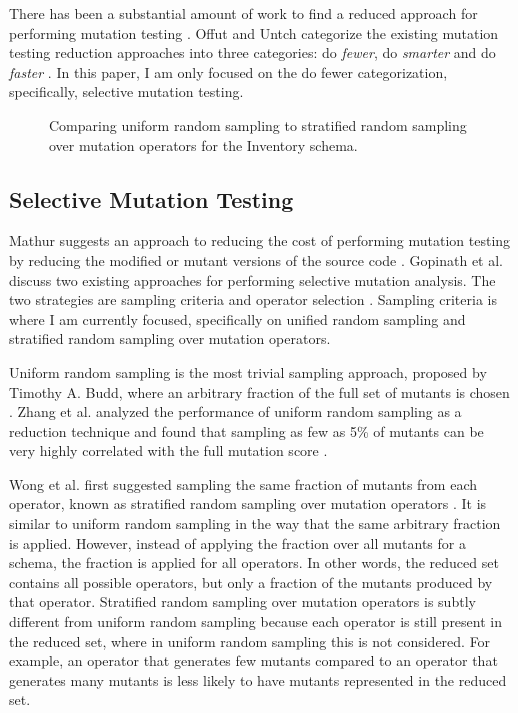 \documentclass[conference]{IEEEtran}
\begin{document}
There has been a substantial amount of work to find a reduced approach
for performing mutation testing \cite{gopinath2015empirical, mcminnvirtual, gopinath2015mutation, offutt1993experimental}.
Offut and Untch categorize the existing mutation testing reduction approaches
into three categories: do \textit{fewer}, do \textit{smarter} and do \textit{faster} \cite{offutt1993experimental}.
In this paper, I am only focused on the do fewer categorization,
specifically, selective mutation testing.

\begin{figure*}[!ht]
\centering
{}
\hfil
{}
\caption{Comparing uniform random sampling to stratified random sampling over
mutation operators for the Inventory schema.}
\label{fig:comp}
\end{figure*}


\subsection{Selective Mutation Testing}
Mathur suggests an approach to reducing the cost of performing mutation testing by
reducing the modified or mutant versions of the source code \cite{mathur1991performance}.
Gopinath et al. discuss two existing approaches for performing selective
mutation analysis. The two strategies are
sampling criteria and operator selection \cite{gopinath2015mutation}. Sampling criteria is where I am
currently focused, specifically on unified random sampling and stratified
random sampling over mutation operators.

Uniform random sampling is the most trivial sampling approach, proposed by Timothy A. Budd,
where an arbitrary fraction of the full set of mutants is chosen \cite{budd1980mutation}.
Zhang et al. analyzed the performance of uniform random sampling as a reduction technique
and found that sampling as few as 5\% of mutants can be very highly correlated with the full mutation
score \cite{zhang2010operator, zhang2013operator}.

Wong et al. first suggested sampling the same fraction of mutants from each operator, known as
stratified random sampling over mutation operators \cite{wong1995reducing}. It is similar
to uniform random sampling in the way that the same arbitrary fraction is applied. However,
instead of applying the fraction over all mutants for a schema, the fraction is applied for all operators. In other
words, the reduced set contains all possible operators, but only a fraction of the mutants
produced by that operator. Stratified random sampling over mutation operators is subtly different
from uniform random sampling because each operator is still present in the reduced set, where
in uniform random sampling this is not considered. For example, an operator that generates few
mutants compared to an operator that generates many mutants is less likely to have mutants represented
in the reduced set.
\end{document}

